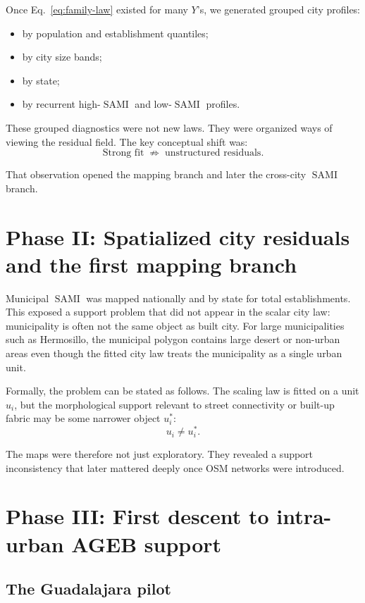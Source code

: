\documentclass[11pt]{article}
\newcommand{\SAMI}{\operatorname{SAMI}}
\begin{document}
Once Eq.~\eqref{eq:family-law} existed for many \(Y\)'s, we generated grouped city profiles:
\begin{itemize}
\item by population and establishment quantiles;
\item by city size bands;
\item by state;
\item by recurrent high-\(\SAMI\) and low-\(\SAMI\) profiles.
\end{itemize}

These grouped diagnostics were not new laws. They were organized ways of viewing the residual field. The key conceptual shift was:
\begin{equation}
\text{Strong fit} \;\not\Rightarrow\; \text{unstructured residuals}.
\end{equation}

That observation opened the mapping branch and later the cross-city \(\SAMI\) branch.

\section{Phase II: Spatialized city residuals and the first mapping branch}

Municipal \(\SAMI\) was mapped nationally and by state for total establishments. This exposed a support problem that did not appear in the scalar city law: municipality is often not the same object as built city. For large municipalities such as Hermosillo, the municipal polygon contains large desert or non-urban areas even though the fitted city law treats the municipality as a single urban unit.

Formally, the problem can be stated as follows. The scaling law is fitted on a unit \(u_i\), but the morphological support relevant to street connectivity or built-up fabric may be some narrower object \(u_i^\ast\):
\begin{equation}
u_i \neq u_i^\ast.
\end{equation}

The maps were therefore not just exploratory. They revealed a support inconsistency that later mattered deeply once OSM networks were introduced.

\section{Phase III: First descent to intra-urban AGEB support}

\subsection{The Guadalajara pilot}
\end{document}
